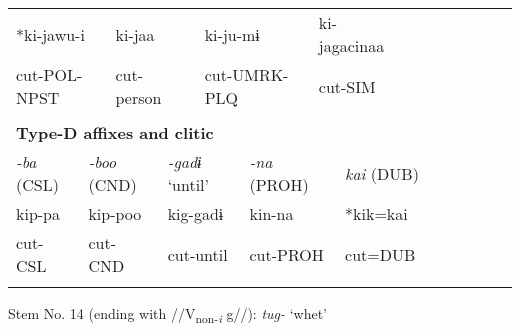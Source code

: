 \begin{tabularx}{\textwidth}{XXXXXXXXXXXXXXXXXXXXXX}
\multicolumn{4}{X}{{ *ki-jawu-i}} & \multicolumn{3}{X}{ki-jaa} & \multicolumn{4}{X}{ki-ju-mɨ} & \multicolumn{4}{X}{{ ki-jagacinaa}} & \multicolumn{7}{X}{}\\
\multicolumn{4}{X}{cut-POL-NPST} & \multicolumn{3}{X}{cut-person} & \multicolumn{4}{X}{cut-UMRK-PLQ} & \multicolumn{4}{X}{cut-SIM} & \multicolumn{7}{X}{}\\
\multicolumn{22}{X}{}\\
\multicolumn{22}{X}{{\bfseries Type-D affixes and clitic}}\\
\multicolumn{3}{X}{{ \textit{{}-ba} (CSL)}} & \multicolumn{3}{X}{{ \textit{{}-boo} (CND)}} & \multicolumn{2}{X}{{ \textit{{}-gadɨ} ‘until’}} & \multicolumn{4}{X}{{ \textit{{}-na} (PROH)}} & \multicolumn{5}{X}{{ \textit{kai} (DUB)}} & \multicolumn{5}{X}{}\\
\multicolumn{3}{X}{{ kip-pa}} & \multicolumn{3}{X}{{ kip-poo}} & \multicolumn{2}{X}{{ kig-gadɨ}} & \multicolumn{4}{X}{{ kin-na}} & \multicolumn{5}{X}{{ *kik=kai}} & \multicolumn{5}{X}{}\\
\multicolumn{3}{X}{cut-CSL} & \multicolumn{3}{X}{cut-CND} & \multicolumn{2}{X}{cut-until} & \multicolumn{4}{X}{cut-PROH} & \multicolumn{5}{X}{cut=DUB} & \multicolumn{5}{X}{}\\
\lspbottomrule
\end{tabularx}
Stem No. 14 (ending with //V\textsubscript{non-}\textit{\textsubscript{i}} g//): \textit{tug-} ‘whet’

\tablefirsthead{}

